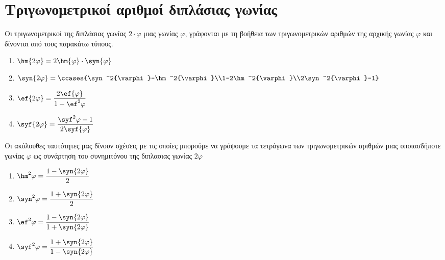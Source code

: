\section{Τριγωνομετρικοί αριθμοί διπλάσιας γωνίας}
\thewrhmata
{}
Οι τριγωνομετρικοί της διπλάσιας γωνίας $ 2\cdot\varphi $ μιας γωνίας $ \varphi $, γράφονται με τη βοήθεια των τριγωνομετρικών αριθμών της αρχικής γωνίας $ \varphi $ και δίνονται από τους παρακάτω τύπους.
\begin{multicols}{2}
\begin{enumerate}[itemsep=0mm]
\item $ \hm{2\varphi}=2\hm{\varphi}\cdot\syn{\varphi} $
\item $ \syn{2\varphi}=\ccases{\syn^2{\varphi}-\hm^2{\varphi}\\1-2\hm^2{\varphi}\\2\syn^2{\varphi}-1} $
\item $ \ef{2\varphi}=\dfrac{2\ef{\varphi}}{1-\ef^2{\varphi}}$
\item $ \syf{2\varphi}=\dfrac{\syf^2{\varphi}-1}{2\syf{\varphi}} $
\end{enumerate}
\end{multicols}
Οι ακόλουθες ταυτότητες μας δίνουν σχέσεις με τις οποίες μπορούμε να γράψουμε τα τετράγωνα των τριγωνομετρικών αριθμών μιας οποιασδήποτε γωνίας $ \varphi $ ως συνάρτηση του συνημιτόνου της διπλασιας γωνίας $ 2\varphi $
\begin{multicols}{2}
\begin{enumerate}
\item $ \hm^2{\varphi}=\dfrac{1-\syn{2\varphi}}{2} $
\item $ \syn^2{\varphi}=\dfrac{1+\syn{2\varphi}}{2} $
\item $ \ef^2{\varphi}=\dfrac{1-\syn{2\varphi}}{1+\syn{2\varphi}} $
\item $ \syf^2{\varphi}=\dfrac{1+\syn{2\varphi}}{1-\syn{2\varphi}} $
\end{enumerate}
\end{multicols}